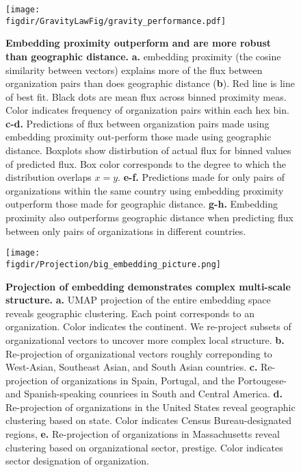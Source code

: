 \documentclass[12pt]{article} %
\def\figdir{../Figs}
\begin{document}
%
%
\begin{figure}[h!]
	\centering
	\label{fig:gravity_performance}
	\texttt{[image: \\figdir/GravityLawFig/gravity\_performance.pdf]}
	\caption{
		\textbf{Embedding proximity outperform and are more robust than geographic distance.}
		\textbf{a.} embedding proximity (the cosine similarity between vectors) explains more of the flux between organization pairs than does geographic distance (\textbf{b}). 
		Red line is line of best fit. 
		Black dots are mean flux across binned proximity meas.
		Color indicates frequency of organization pairs within each hex bin.
		\textbf{c-d.} Predictions  of flux between organization pairs made using embedding proximity out-perform those made using geographic distance. 
		Boxplots show distirbution of actual flux for binned values of predicted flux.
		Box color corresponds to the degree to which the distribution overlaps $x = y$.
		\textbf{e-f.} Predictions made for only pairs of organizations within the same country using embedding proximity outperform those made for geographic distance.
		\textbf{g-h.} Embedding proximity also outperforms geographic distance when predicting flux between only pairs of organizations in different countries. 
	}
\end{figure}



%
%
\begin{figure}[hp!]
	\centering
	\label{fig:projection}
	\texttt{[image: \\figdir/Projection/big\_embedding\_picture.png]}
	\caption{
		\textbf{Projection of embedding demonstrates complex multi-scale structure.}
		\textbf{a.}
		UMAP projection of the entire embedding space reveals geographic clustering.
		Each point corresponds to an organization.
		Color indicates the continent. 
		We re-project subsets of organizational vectors to uncover more complex local structure.
		\textbf{b.} Re-projection of organizational vectors roughly correponding to West-Asian, Southeast Asian, and South Asian countries. 
		\textbf{c.} Re-projection of organizations in Spain, Portugal, and the Portougese- and Spanish-speaking counriees in South and Central America. 
		\textbf{d.} Re-projection of organizations in the United States reveal geographic clustering based on state.
		Color indicates Census Bureau-designated regions,
		\textbf{e.} Re-projection of organizations in Massachusetts reveal clustering based on organizational sector, prestige. 
		Color indicates sector designation of organization. 
	}
\end{figure}
\end{document}
